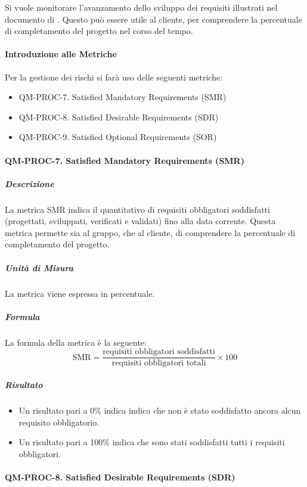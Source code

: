 		Si vuole monitorare l'avanzamento dello sviluppo dei requisiti illustrati nel documento di . Questo può essere utile al cliente, per comprendere la percentuale di completamento del progetto nel corso del tempo.

		\paragraph{Introduzione alle Metriche}

		Per la gestione dei rischi si farà uso delle seguenti metriche:

		\begin{itemize}
			\item QM-PROC-7. Satisfied Mandatory Requirements (SMR)
			\item QM-PROC-8. Satisfied Desirable Requirements (SDR)
			\item QM-PROC-9. Satisfied Optional Requirements (SOR)
		\end{itemize}

		\paragraph{QM-PROC-7. Satisfied Mandatory Requirements (SMR)}

			\subparagraph{Descrizione}
			La metrica SMR indica il quantitativo di requisiti obbligatori soddisfatti (progettati, sviluppati, verificati e validati) fino alla data corrente. Questa metrica permette sia al gruppo, che al cliente, di comprendere la percentuale di completamento del progetto.

			\subparagraph{Unità di Misura}
			La metrica viene espressa in percentuale.

			\subparagraph{Formula}
			La formula della metrica è la seguente:
			\[
				\text{SMR} = \frac{\text{requisiti obbligatori soddisfatti}}{\text{requisiti obbligatori totali}} \times 100
			\]

			\subparagraph{Risultato}
			\begin{itemize}
				\item Un risultato pari a 0\% indica indica che non è stato soddisfatto ancora alcun requisito obbligatorio.
				\item Un risultato pari a 100\% indica che sono stati soddisfatti tutti i requisiti obbligatori.
			\end{itemize}

		\paragraph{QM-PROC-8. Satisfied Desirable Requirements (SDR)}

